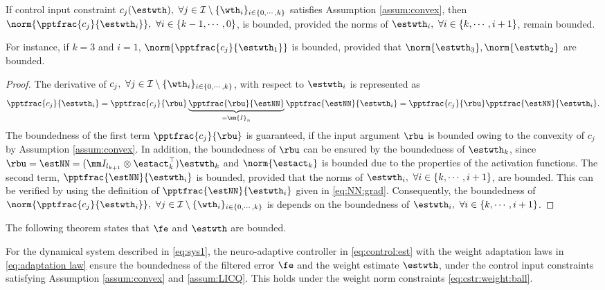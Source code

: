 \documentclass[journal]{IEEEtran}
\begin{document}
\begin{lem} 
    If control input constraint $c_j(\estwth),\ \forall j\in\mathcal I \setminus \{\wth_i\}_{i\in\{0,\cdots,k\}}$ satisfies Assumption \ref{assum:convex}, then $\norm{\pptfrac{c_j}{\estwth_i}},\ \forall i\in\{k-1,\cdots, 0\}$, is bounded, provided the norms of $\estwth_i,\ \forall i\in\{k,\cdots, i+1\}$, remain bounded.
    \label{lem:cstr:grad:bound}
\end{lem}

For instance, if $k=3$ and $i=1$, $\norm{\pptfrac{c_j}{\estwth_1}}$ is bounded, provided that $\norm{\estwth_3},\norm{\estwth_2}$ are bounded.

\begin{proof}

The derivative of $c_j,\ \forall j\in\mathcal I \setminus \{\wth_i\}_{i\in\{0,\cdots,k\}}$, with respect to $\estwth_i$ is represented as
\begin{equation}
    \pptfrac{c_j}{\estwth_i} 
    = 
    \pptfrac{c_j}{\rbu} 
    \underbrace{
        \pptfrac{\rbu}{\estNN} 
    }_{=\mm{I}_n}
    \pptfrac{\estNN}{\estwth_i}
    = 
    \pptfrac{c_j}{\rbu} 
    \pptfrac{\estNN}{\estwth_i}
    .
\end{equation}
The boundedness of the first term $\pptfrac{c_j}{\rbu}$ is guaranteed, if the input argument $\rbu$ is bounded owing to the convexity of $c_j$ by Assumption \ref{assum:convex}.
In addition, the boundedness of $\rbu$ can be ensured by the boundedness of $\estwth_k$, since $\rbu=\estNN=(\mm I_{l_{k+1}}\otimes \estact_k^\top)\estwth_k$ and $\norm{\estact_k}$ is bounded due to the properties of the activation functions.
The second term, $\pptfrac{\estNN}{\estwth_i}$ is bounded, provided that the norms of $\estwth_i,\ \forall i \in\{k,\cdots,i+1\}$, are bounded. 
This can be verified by using the definition of $\pptfrac{\estNN}{\estwth_i}$ given in \eqref{eq:NN:grad}.
Consequently, the boundedness of $\norm{\pptfrac{c_j}{\estwth_i}},\ \forall j\in\mathcal I \setminus \{\wth_i\}_{i\in\{0,\cdots,k\}}$ is depends on the boundedness of $\estwth_i,\ \forall i\in \{k,\cdots,i+1\}$.

\end{proof}

The following theorem states that $\fe$ and $\estwth$ are bounded.

\begin{theorem}
    For the dynamical system described in \eqref{eq:sys1}, the neuro-adaptive controller in \eqref{eq:control:est} with the weight adaptation laws in \eqref{eq:adaptation law} ensure the boundedness of the filtered error $\fe$ and the weight estimate $\estwth$, under the control input constraints satisfying Assumption \ref{assum:convex} and \ref{assum:LICQ}.
    This holds under the weight norm constraints \eqref{eq:cstr:weight:ball}.
\end{theorem}
\end{document}
